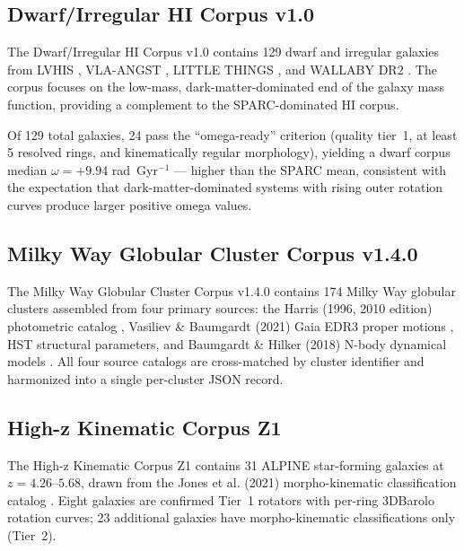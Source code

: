 \documentclass[twocolumn]{aastex631}
\begin{document}
\subsection{Dwarf/Irregular HI Corpus v1.0}
\label{sec:dwarfs}

The Dwarf/Irregular HI Corpus v1.0 \citep{flynn2026_dwarfs} contains 129
dwarf and irregular galaxies from LVHIS \citep{koribalski2018}, VLA-ANGST
\citep{ott2012}, LITTLE THINGS \citep{oh2015}, and WALLABY DR2
\citep{koribalski2020}. The corpus focuses on the low-mass, dark-matter-dominated
end of the galaxy mass function, providing a complement to the SPARC-dominated
HI corpus.

Of 129 total galaxies, 24 pass the ``omega-ready'' criterion (quality tier~1,
at least 5 resolved rings, and kinematically regular morphology), yielding a dwarf
corpus median $\omega = +9.94$ rad~Gyr$^{-1}$ --- higher than the SPARC mean,
consistent with the expectation that dark-matter-dominated systems with
rising outer rotation curves produce larger positive omega values.

\subsection{Milky Way Globular Cluster Corpus v1.4.0}
\label{sec:gc}

The Milky Way Globular Cluster Corpus v1.4.0 \citep{flynn2026_gc} contains
174 Milky Way globular clusters assembled from four primary sources: the
Harris (1996, 2010 edition) photometric catalog \citep{harris1996}, Vasiliev
\& Baumgardt (2021) Gaia EDR3 proper motions \citep{vasiliev2021}, HST structural
parameters, and Baumgardt \& Hilker (2018) N-body dynamical models
\citep{baumgardt2018}. All four source catalogs are cross-matched by cluster
identifier and harmonized into a single per-cluster JSON record.

\subsection{High-z Kinematic Corpus Z1}
\label{sec:z1}

The High-z Kinematic Corpus Z1 \citep{flynn2026_z1} contains 31 ALPINE
\citep{lefevre2020} star-forming galaxies at $z = 4.26$--$5.68$, drawn from
the Jones et al. (2021) morpho-kinematic classification catalog
\citep{jones2021}. Eight galaxies are confirmed Tier~1 rotators with per-ring
3DBarolo rotation curves; 23 additional galaxies have morpho-kinematic
classifications only (Tier~2).
\end{document}
